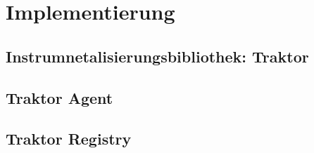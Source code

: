%
\chapter{Implementierung}
\label{chapter:Implementierung}
\section{Instrumnetalisierungsbibliothek: Traktor}
\label{section:Instrumnetalisierungsbibliothek: Traktor}
\section{Traktor Agent}
\label{section:Traktor Agent}

\section{Traktor Registry}
\label{section:Traktor Registry}

